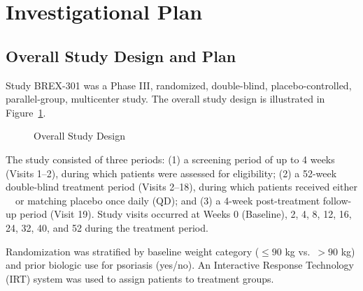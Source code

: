 \section{Investigational Plan}

\subsection{Overall Study Design and Plan}

Study BREX-301 was a Phase III, randomized, double-blind, placebo-controlled, parallel-group, multicenter study. The overall study design is illustrated in Figure~\ref{fig:studydesign}.

\begin{figure}[H]
\centering
{}
\caption{Overall Study Design}
\label{fig:studydesign}
\end{figure}

The study consisted of three periods: (1) a screening period of up to 4 weeks (Visits 1--2), during which patients were assessed for eligibility; (2) a 52-week double-blind treatment period (Visits 2--18), during which patients received either \studydrug\ \studydose\ or matching placebo once daily (QD); and (3) a 4-week post-treatment follow-up period (Visit 19). Study visits occurred at Weeks 0 (Baseline), 2, 4, 8, 12, 16, 24, 32, 40, and 52 during the treatment period.

\vspace{4pt}
Randomization was stratified by baseline weight category ($\le 90$ kg vs.\ $> 90$ kg) and prior biologic use for psoriasis (yes/no). An Interactive Response Technology (IRT) system was used to assign patients to treatment groups.

